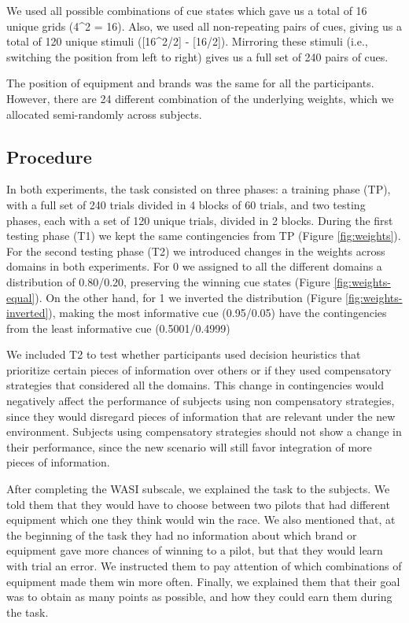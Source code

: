 \documentclass[
  english,
  man]{apa6}
\begin{document}
We used all possible combinations of cue states which gave us a total of 16 unique grids (4\^{}2 = 16). Also, we used all non-repeating pairs of cues, giving us a total of 120 unique stimuli ({[}16\^{}2/2{]} - {[}16/2{]}). Mirroring these stimuli (i.e., switching the position from left to right) gives us a full set of 240 pairs of cues.

The position of equipment and brands was the same for all the participants. However, there are 24 different combination of the underlying weights, which we allocated semi-randomly across subjects.

\hypertarget{procedure}{%
\subsection{Procedure}\label{procedure}}

In both experiments, the task consisted on three phases: a training phase (TP), with a full set of 240 trials divided in 4 blocks of 60 trials, and two testing phases, each with a set of 120 unique trials, divided in 2 blocks. During the first testing phase (T1) we kept the same contingencies from TP (Figure \ref{fig:weights}). For the second testing phase (T2) we introduced changes in the weights across domains in both experiments. For 0 we assigned to all the different domains a distribution of 0.80/0.20, preserving the winning cue states (Figure \ref{fig:weights-equal}). On the other hand, for 1 we inverted the distribution (Figure \ref{fig:weights-inverted}), making the most informative cue (0.95/0.05) have the contingencies from the least informative cue (0.5001/0.4999)

We included T2 to test whether participants used decision heuristics that prioritize certain pieces of information over others or if they used compensatory strategies that considered all the domains. This change in contingencies would negatively affect the performance of subjects using non compensatory strategies, since they would disregard pieces of information that are relevant under the new environment. Subjects using compensatory strategies should not show a change in their performance, since the new scenario will still favor integration of more pieces of information.

After completing the WASI subscale, we explained the task to the subjects. We told them that they would have to choose between two pilots that had different equipment which one they think would win the race. We also mentioned that, at the beginning of the task they had no information about which brand or equipment gave more chances of winning to a pilot, but that they would learn with trial an error. We instructed them to pay attention of which combinations of equipment made them win more often. Finally, we explained them that their goal was to obtain as many points as possible, and how they could earn them during the task.
\end{document}

